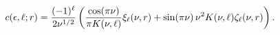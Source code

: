 \[\mathop{c\/}\nolimits\!\left(\epsilon,\ell;r\right)=\frac{(-1)^{\ell}}{2\nu^{1%
/2}}\left(\frac{\mathop{\cos\/}\nolimits\!\left(\pi\nu\right)}{\pi K(\nu,\ell)%
}\xi_{\ell}(\nu,r)+\mathop{\sin\/}\nolimits\!\left(\pi\nu\right)\nu^{2}K(\nu,%
\ell)\zeta_{\ell}(\nu,r)\right).\]